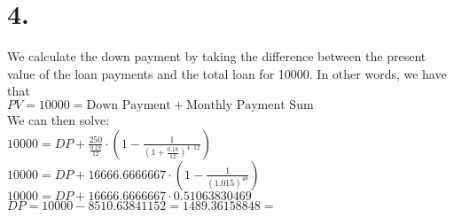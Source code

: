 \documentclass{article}
\begin{document}
\section*{4.}
{\Large 

We calculate the down payment by taking the difference between the present value of the loan payments and the total loan for 10000. In other words, we have that \\
$PV = 10000 = \text{Down Payment} + \text{Monthly Payment Sum}$ \\
We can then solve: \\
$10000 = DP + \frac{250}{\frac{0.18}{12}} \cdot (1 - \frac{1}{(1 + \frac{0.18}{12})^{4 \cdot 12}})$ \\
$10000 = DP + 16666.6666667 \cdot (1 - \frac{1}{(1.015)^{48}})$ \\
$10000 = DP + 16666.6666667 \cdot 0.51063830469$ \\
$DP = 10000 - 8510.63841152 = 1489.36158848 = $ 

}
\end{document}
